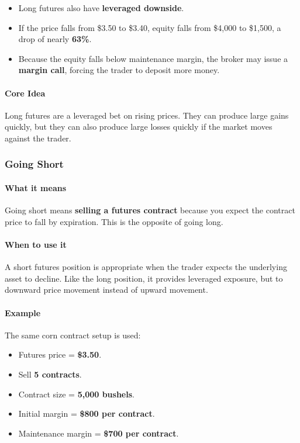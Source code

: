 \documentclass[12pt,openany]{book}
\begin{document}
\begin{itemize}[leftmargin=*]
    \item Long futures also have \textbf{leveraged downside}.
    \item If the price falls from \$3.50 to \$3.40, equity falls from \$4,000 to \$1,500, a drop of nearly \textbf{63\%}.
    \item Because the equity falls below maintenance margin, the broker may issue a \textbf{margin call}, forcing the trader to deposit more money.
\end{itemize}

\paragraph{Core Idea}

Long futures are a leveraged bet on rising prices. They can produce large gains quickly, but they can also produce large losses quickly if the market moves against the trader.

\subsubsection{Going Short}

\paragraph{What it means}

Going short means \textbf{selling a futures contract} because you expect the contract price to fall by expiration. This is the opposite of going long.

\paragraph{When to use it}

A short futures position is appropriate when the trader expects the underlying asset to decline. Like the long position, it provides leveraged exposure, but to downward price movement instead of upward movement.

\paragraph{Example}

The same corn contract setup is used:

\begin{itemize}[leftmargin=*]
    \item Futures price = \textbf{\$3.50}.
    \item Sell \textbf{5 contracts}.
    \item Contract size = \textbf{5,000 bushels}.
    \item Initial margin = \textbf{\$800 per contract}.
    \item Maintenance margin = \textbf{\$700 per contract}.
\end{itemize}
\end{document}
